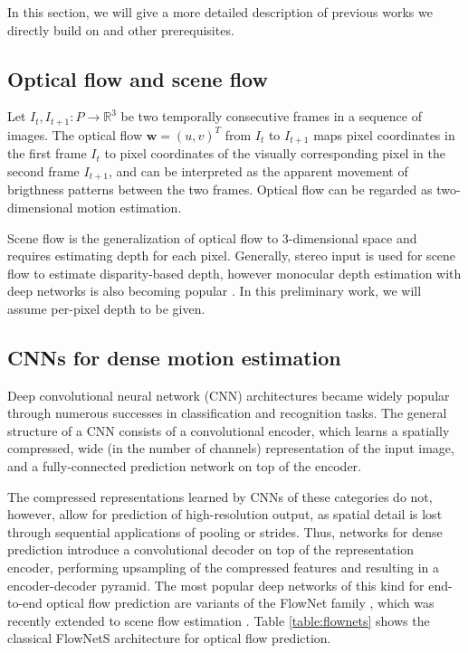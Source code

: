 In this section, we will give a more detailed description of previous works
we directly build on and other prerequisites.

\subsection{Optical flow and scene flow}
Let $I_t,I_{t+1} : P \to \mathbb{R}^3$ be two temporally consecutive frames in a
sequence of images.
The optical flow
$\mathbf{w} = (u, v)^T$ from $I_t$ to $I_{t+1}$
maps pixel coordinates in the first frame $I_t$ to pixel coordinates of the
visually corresponding pixel in the second frame $I_{t+1}$,
and can be interpreted as the apparent movement of brigthness patterns between the two frames.
Optical flow can be regarded as two-dimensional motion estimation.

Scene flow is the generalization of optical flow to 3-dimensional space and
requires estimating depth for each pixel. Generally, stereo input is used for scene flow
to estimate disparity-based depth, however monocular depth estimation with deep networks is also becoming
popular \cite{DeeperDepth, UnsupPoseDepth}.
In this preliminary work, we will assume per-pixel depth to be given.

\subsection{CNNs for dense motion estimation}
Deep convolutional neural network (CNN) architectures
\cite{ImageNetCNN, VGGNet, ResNet}
became widely popular through numerous successes in classification and recognition tasks.
The general structure of a CNN consists of a convolutional encoder, which
learns a spatially compressed, wide (in the number of channels) representation of the input image,
and a fully-connected prediction network on top of the encoder.

The compressed representations learned by CNNs of these categories do not, however, allow
for prediction of high-resolution output, as spatial detail is lost through sequential applications
of pooling or strides.
Thus, networks for dense prediction introduce a convolutional decoder on top of the representation encoder,
performing upsampling of the compressed features and resulting in a encoder-decoder pyramid.
The most popular deep networks of this kind for end-to-end optical flow prediction
are variants of the FlowNet family \cite{FlowNet, FlowNet2},
which was recently extended to scene flow estimation \cite{SceneFlowDataset}.
Table \ref{table:flownets} shows the classical FlowNetS architecture for optical flow prediction.

